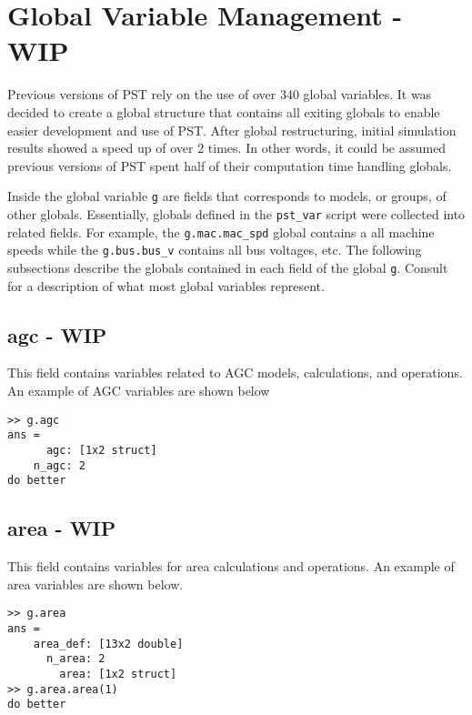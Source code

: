 \pagebreak
\section{Global Variable Management  - WIP}  
Previous versions of PST rely on the use of over 340 global variables.
It was decided to create a global structure that contains all exiting globals to enable easier development and use of PST.
After global restructuring, initial simulation results showed a speed up of over 2 times.
In other words, it could be assumed previous versions of PST spent half of their computation time handling globals.


Inside the global variable \verb|g| are fields that corresponds to models, or groups, of other globals.
Essentially, globals defined in the \verb|pst_var| script were collected into related fields.
For example, the \verb|g.mac.mac_spd| global contains a all machine speeds while the \verb|g.bus.bus_v| contains all bus voltages, etc.
The following subsections describe the globals contained in each field of the global \verb|g|. 
Consult \cite{PST3manual} for a description of what most global variables represent.


\subsection{agc - WIP}  
This field contains variables related to AGC models, calculations, and operations.
An example of AGC variables are shown below

\begin{verbatim}
>> g.agc
ans = 
      agc: [1x2 struct]
    n_agc: 2
do better
\end{verbatim}

\subsection{area - WIP}  
This field contains variables for area calculations and operations.
An example of area variables are shown below.
\begin{verbatim}
>> g.area
ans = 
    area_def: [13x2 double]
      n_area: 2
        area: [1x2 struct]
>> g.area.area(1)
do better
\end{verbatim}

